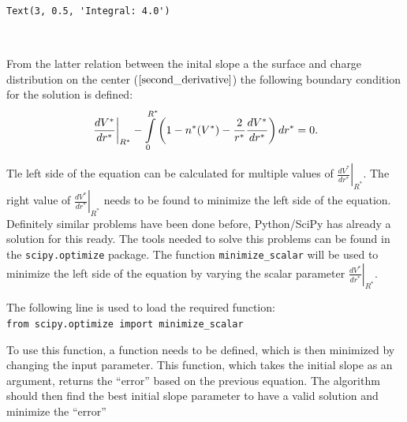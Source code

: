 \documentclass[11pt]{article}
\makeatletter
\newcommand{\boxspacing}{\kern\kvtcb@left@rule\kern\kvtcb@boxsep}
\newcommand{\prompt}[4]{
        \ttfamily\llap{{\color{#2}[#3]:\hspace{3pt}#4}}\vspace{-\baselineskip}
    }
\makeatother
\begin{document}
            \begin{tcolorbox}[breakable, size=fbox, boxrule=.5pt, pad at break*=1mm, opacityfill=0]
\prompt{Out}{outcolor}{15}{\boxspacing}
\begin{Verbatim}[commandchars=\\\{\}]
Text(3, 0.5, 'Integral: 4.0')
\end{Verbatim}
\end{tcolorbox}
        
    \begin{center}
    \end{center}
    { \hspace*{\fill} \\}
    
    From the latter relation between the inital slope a the surface and
charge distribution on the center (\(\ref{second_derivative}\)) the
following boundary condition for the solution is defined: \begin{align}
\left.\frac{dV^*}{dr^{*}}\right|_{R^*}-\intop_{0}^{R^*}\left(1-n^{*}(V^{*})-\frac{2}{r^{*}}\frac{dV^{*}}{dr^{*}}\right)dr^* = 0.
\end{align}

Tle left side of the equation can be calculated for multiple values of
\(\left.\frac{dV^*}{dr^{*}}\right|_{R^*}\). The right value of
\(\left.\frac{dV^*}{dr^{*}}\right|_{R^*}\) needs to be found to minimize
the left side of the equation. Definitely similar problems have been
done before, Python/SciPy has already a solution for this ready. The
tools needed to solve this problems can be found in the
\texttt{scipy.optimize} package. The function \texttt{minimize\_scalar}
will be used to minimize the left side of the equation by varying the
scalar parameter \(\left.\frac{dV^*}{dr^{*}}\right|_{R^*}\).

The following line is used to load the required function:
\texttt{from\ scipy.optimize\ import\ minimize\_scalar}

To use this function, a function needs to be defined, which is then
minimized by changing the input parameter. This function, which takes
the initial slope as an argument, returns the ``error'' based on the
previous equation. The algorithm should then find the best initial slope
parameter to have a valid solution and minimize the ``error''
\end{document}
